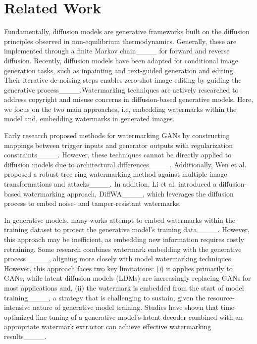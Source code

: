 \section{Related Work}
Fundamentally, diffusion models are generative frameworks built on the diffusion principles observed in non-equilibrium thermodynamics. Generally, these are implemented through a finite Markov chain____ for forward and reverse diffusion. Recently, diffusion models have been adapted for conditional image generation tasks, such as inpainting and text-guided generation and editing. Their iterative de-noising steps enables zero-shot image editing by guiding the generative process____.Watermarking techniques are actively researched to address copyright and misuse concerns in diffusion-based generative models. Here, we focus on the two main approaches, i.e, embedding watermarks within the model and, embedding watermarks in generated images.

Early research proposed methods for watermarking GANs by constructing mappings between trigger inputs and generator outputs with regularization constraints____. However, these techniques cannot be directly applied to diffusion models due to architectural differences____. Additionally, Wen et al. proposed a robust tree-ring watermarking method against multiple image transformations and attacks____. In addition, Li et al. introduced a diffusion-based watermarking approach, DiffWA____, which leverages the diffusion process to embed noise- and tamper-resistant watermarks.

In generative models, many works attempt to embed watermarks within the training dataset to protect the generative model's training data____. However, this approach may be inefficient, as embedding new information requires costly retraining. Some research combines watermark embedding with the generative process ____, aligning more closely with model watermarking techniques. However, this approach faces two key limitations: (\textit{i}) it applies primarily to GANs, while latent diffusion models (LDMs) are increasingly replacing GANs for most applications and, (ii) the watermark is embedded from the start of model training____, a strategy that is challenging to sustain, given the resource-intensive nature of generative model training. Studies have shown that time-optimized fine-tuning of a generative model's latent decoder combined with an appropriate watermark extractor can achieve effective watermarking results____.